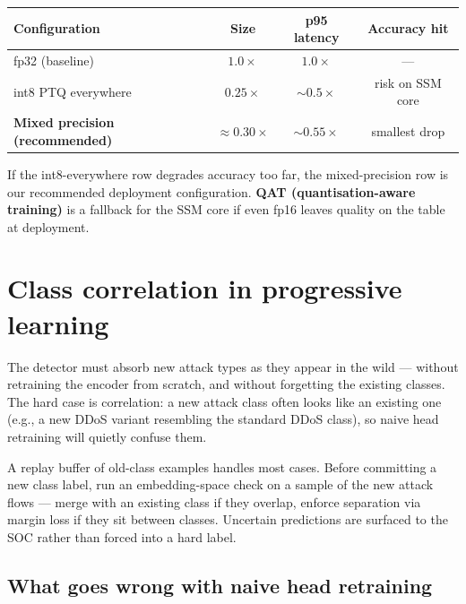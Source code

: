 \documentclass[11pt,a4paper]{article}
\begin{document}
\begin{center}
\small
\begin{tabularx}{\linewidth}{@{}Xccc@{}}
\toprule
\textbf{Configuration} & \textbf{Size} & \textbf{p95 latency} & \textbf{Accuracy hit} \\
\midrule
fp32 (baseline)                                 & $1.0\times$         & $1.0\times$         & --- \\
int8 PTQ everywhere                             & $0.25\times$        & ${\sim}0.5\times$   & risk on SSM core \\
\textbf{Mixed precision (recommended)}          & $\approx 0.30\times$ & ${\sim}0.55\times$ & smallest drop \\
\bottomrule
\end{tabularx}
\end{center}

If the int8-everywhere row degrades accuracy too far, the mixed-precision row is our recommended deployment configuration. \textbf{QAT (quantisation-aware training)} is a fallback for the SSM core if even fp16 leaves quality on the table at deployment.

\section{Class correlation in progressive learning}

The detector must absorb new attack types as they appear in the wild --- without retraining the encoder from scratch, and without forgetting the existing classes. The hard case is correlation: a new attack class often looks like an existing one (e.g., a new DDoS variant resembling the standard DDoS class), so naive head retraining will quietly confuse them.

\begin{tcolorbox}[idea]
A replay buffer of old-class examples handles most cases. Before committing a new class label, run an embedding-space check on a sample of the new attack flows --- merge with an existing class if they overlap, enforce separation via margin loss if they sit between classes. Uncertain predictions are surfaced to the SOC rather than forced into a hard label.
\end{tcolorbox}

\subsection{What goes wrong with naive head retraining}
\end{document}
